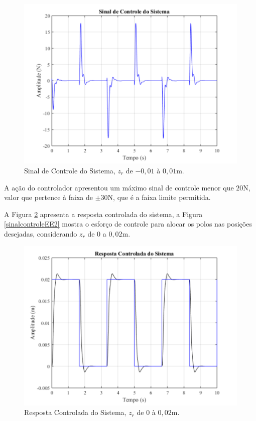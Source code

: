 \documentclass[journal,brazil,english]{IEEEtran}
\begin{document}
\begin{figure}[H]
	\centering
\includegraphics[width=\columnwidth]{./imagens/sinal_controle_sistema.pdf}
    \renewcommand{\figurename}{Fig.}
    \caption{Sinal de Controle do Sistema, $z_r$ de $-0,01$ à $0,01$m.}
	\label{sinalcontroleEE}
\end{figure}
A ação do controlador apresentou um máximo sinal de controle menor que $20$N, valor que pertence à faixa de $\pm 30$N, que é a faixa limite permitida.

A Figura \ref{malhafechadaEE2} apresenta a resposta controlada do sistema, a Figura \ref{sinalcontroleEE2} mostra o esforço de controle para alocar os polos nas posições desejadas, considerando $z_r$ de $0$ a $0,02$m.

\begin{figure}[H]
	\centering
\includegraphics[width=\columnwidth]{./imagens/resposta_controlada_sistema2.pdf}
    \renewcommand{\figurename}{Fig.}
    \caption{Resposta Controlada do Sistema, $z_r$ de $0$ à $0,02$m.}
	\label{malhafechadaEE2}
\end{figure}
\end{document}
